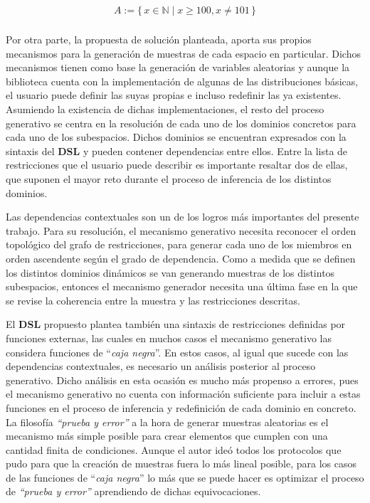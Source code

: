 \newcommand\Set[2]{\{\,#1\mid#2\,\}}
\newcommand\SET[2]{\Set{#1}{\text{#2}}}

\begin{align*}
    A := \Set{x \in \mathbb{N}}{x \ge 100, x \neq 101} \\
\end{align*}

Por otra parte, la propuesta de solución planteada, aporta sus propios mecanismos para la
generación de muestras de cada espacio en particular. Dichos mecanismos tienen como base la
generación de variables aleatorias y aunque la biblioteca cuenta con la implementación de
algunas de las distribuciones básicas, el usuario puede definir las suyas propias e incluso
redefinir las ya existentes. Asumiendo la existencia de dichas implementaciones, el resto del
proceso generativo se centra en la resolución de cada uno de los dominios concretos para cada
uno de los subespacios. Dichos dominios se encuentran expresados con la sintaxis del {\bf DSL}
y pueden contener dependencias entre ellos. Entre la lista de restricciones que el usuario puede
describir es importante resaltar dos de ellas, que suponen el mayor reto durante el proceso de
inferencia de los distintos dominios.

Las dependencias contextuales son un de los logros más importantes del presente trabajo. Para
su resolución, el mecanismo generativo necesita reconocer el orden topológico del grafo de
restricciones, para generar cada uno de los miembros en orden ascendente según el grado de
dependencia. Como a medida que se definen los distintos dominios dinámicos se van generando
muestras de los distintos subespacios, entonces el mecanismo generador necesita una última fase
en la que se revise la coherencia entre la muestra y las restricciones descritas.

El {\bf DSL} propuesto plantea también una sintaxis de restricciones definidas por funciones
externas, las cuales en muchos casos el mecanismo generativo las considera funciones
de ``{\it caja negra}''. En estos casos, al igual que sucede con las dependencias contextuales, es
necesario un análisis posterior al proceso generativo. Dicho análisis en esta ocasión es
mucho más propenso a errores, pues el mecanismo generativo no cuenta con información suficiente
para incluir a estas funciones en el proceso de inferencia y redefinición de cada dominio en
concreto. La filosofía {\it “prueba y error”} a la hora de generar muestras aleatorias es el
mecanismo más simple posible para crear elementos que cumplen con una cantidad finita de condiciones.
Aunque el autor ideó todos los protocolos que pudo para que la creación de muestras fuera lo más
lineal posible, para los casos de las funciones de ``{\it caja negra}'' lo más que se puede hacer es
optimizar el proceso de {\it “prueba y error”} aprendiendo de dichas equivocaciones.


